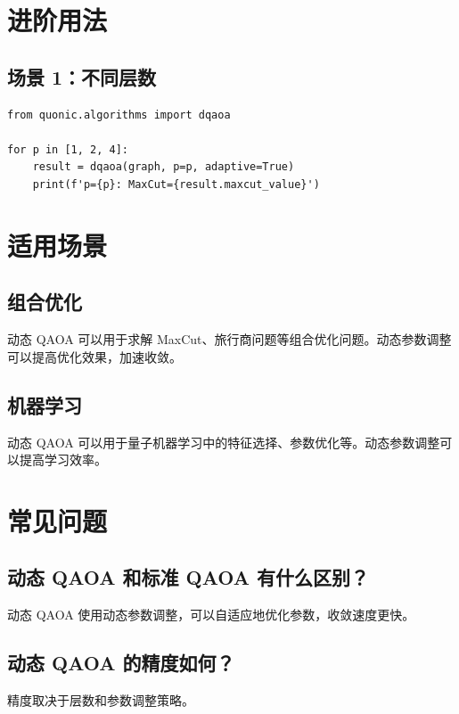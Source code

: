 \documentclass[12pt,a4paper]{article}
\begin{document}
\section{进阶用法}

\subsection{场景 1：不同层数}

\begin{verbatim}
from quonic.algorithms import dqaoa

for p in [1, 2, 4]:
    result = dqaoa(graph, p=p, adaptive=True)
    print(f'p={p}: MaxCut={result.maxcut_value}')
\end{verbatim}

\section{适用场景}

\subsection{组合优化}

动态 QAOA 可以用于求解 MaxCut、旅行商问题等组合优化问题。动态参数调整可以提高优化效果，加速收敛。

\subsection{机器学习}

动态 QAOA 可以用于量子机器学习中的特征选择、参数优化等。动态参数调整可以提高学习效率。

\section{常见问题}

\subsection{动态 QAOA 和标准 QAOA 有什么区别？}

动态 QAOA 使用动态参数调整，可以自适应地优化参数，收敛速度更快。

\subsection{动态 QAOA 的精度如何？}

精度取决于层数和参数调整策略。
\end{document}
